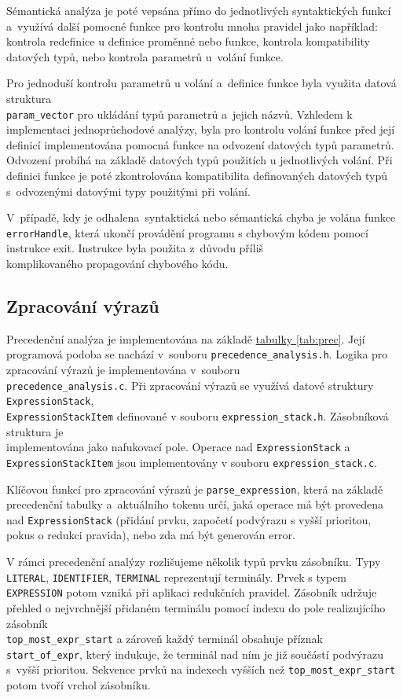 \documentclass[11pt]{article}
\begin{document}
Sémantická analýza je poté vepsána přímo do jednotlivých syntaktických funkcí a~využívá
další pomocné funkce pro kontrolu mnoha pravidel jako například: kontrola redefinice u definice proměnné nebo funkce,
kontrola kompatibility datových typů, nebo kontrola parametrů u~volání funkce. 

Pro jednoduší kontrolu parametrů u volání a~definice funkce byla využita datová struktura \\ \texttt{param\_vector}
pro ukládání typů parametrů a~jejich názvů. Vzhledem k implementaci jednoprůchodové analýzy, byla pro kontrolu volání
funkce před její definicí implementována pomocná funkce na odvození datových typů parametrů.
Odvození probíhá na základě datových typů použitích u jednotlivých volání.
Při definici funkce je poté zkontrolována kompatibilita definovaných datových typů s~odvozenými datovými typy použitými při volání. 

V~případě, kdy je odhalena~syntaktická nebo sémantická chyba je volána funkce \texttt{errorHandle},
která ukončí provádění programu s chybovým kódem pomocí instrukce exit.
Instrukce byla použita z~důvodu příliš\\ komplikovaného propagování chybového kódu.

\subsection{Zpracování výrazů}
Precedenční analýza je implementována na základě \href{tab:prec}{tabulky \ref{tab:prec}}.
Její programová podoba se nachází v~souboru \texttt{precedence\_analysis.h}.
Logika pro zpracování výrazů je implementována v~souboru \\
\texttt{precedence\_analysis.c}.
Při zpracování výrazů se využívá datové struktury \texttt{ExpressionStack},\\ \texttt{ExpressionStackItem} definované v souboru
\texttt{expression\_stack.h}. Zásobníková struktura je\\ implementována jako nafukovací pole.
Operace nad \texttt{ExpressionStack} a \texttt{ExpressionStackItem} jsou implementovány v souboru \texttt{expression\_stack.c}.

Klíčovou funkcí pro zpracování výrazů je \texttt{parse\_expression}, která na základě precedenční tabulky a~aktuálního tokenu určí, jaká operace
má být provedena nad \texttt{ExpressionStack} (přidání prvku, započetí podvýrazu s vyšší prioritou, pokus o redukci pravida), nebo zda má být generován error.


V rámci precedenční analýzy rozlišujeme několik typů prvku zásobníku. Typy \texttt{LITERAL}, \texttt{IDENTIFIER}, \texttt{TERMINAL} reprezentují terminály.
Prvek s typem \texttt{EXPRESSION} potom vzniká při aplikaci redukčních pravidel.
Zásobník udržuje přehled o nejvrchnější přidaném terminálu pomocí indexu do pole realizujícího zásobník\\ \texttt{top\_most\_expr\_start}
a zároveň každý terminál obsahuje příznak \texttt{start\_of\_expr}, který indukuje, že terminál nad ním je již součástí podvýrazu s~vyšší prioritou.
Sekvence prvků na indexech vyšších než \texttt{top\_most\_expr\_start} potom tvoří vrchol zásobníku.
\end{document}
